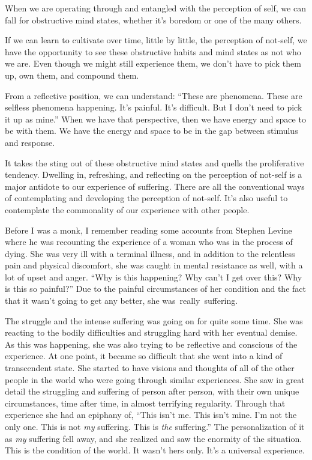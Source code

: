 When we are operating through and entangled with the perception of self, we can fall for obstructive mind states, whether it's boredom or one of the many others.

If we can learn to cultivate over time, little by little, the perception of not-self, we have the opportunity to see these obstructive habits and mind states as not who we are. Even though we might still experience them, we don't have to pick them up, own them, and compound them.

From a reflective position, we can understand: ``These are phenomena. These are selfless phenomena happening. It's painful. It's difficult. But I don't need to pick it up as mine.'' When we have that perspective, then we have energy and space to be with them. We have the energy and space to be in the gap between stimulus and response.

It takes the sting out of these obstructive mind states and quells the proliferative tendency. Dwelling in, refreshing, and reflecting on the perception of not-self is a major antidote to our experience of suffering. There are all the conventional ways of contemplating and developing the perception of not-self. It's also useful to contemplate the commonality of our experience with other people.

Before I was a monk, I remember reading some accounts from Stephen Levine where he was recounting the experience of a woman who was in the process of dying. She was very ill with a terminal illness, and in addition to the relentless pain and physical discomfort, she was caught in mental resistance as well, with a lot of upset and anger. ``Why is this happening? Why can't I get over this? Why is this so painful?'' Due to the painful circumstances of her condition and the fact that it wasn't going to get any better, she \mbox{was really suffering.}

The struggle and the intense suffering was going on for quite some time. She was reacting to the bodily difficulties and struggling hard with her eventual demise. As this was happening, she was also trying to be reflective and conscious of the experience. At one point, it became so difficult that she went into a kind of transcendent state. She started to have visions and thoughts of all of the other people in the world who were going through similar experiences. She saw in great detail the struggling and suffering of person after person, with their own unique circumstances, time after time, in almost terrifying regularity. Through that experience she had an epiphany of, ``This isn't me. This isn't mine. I'm not the only one. This is not \emph{my} suffering. This is \emph{the} suffering.'' The personalization of it as \emph{my} suffering fell away, and she realized and saw the enormity of the situation. This is the condition of the world. It wasn't hers only. It's a universal experience.

